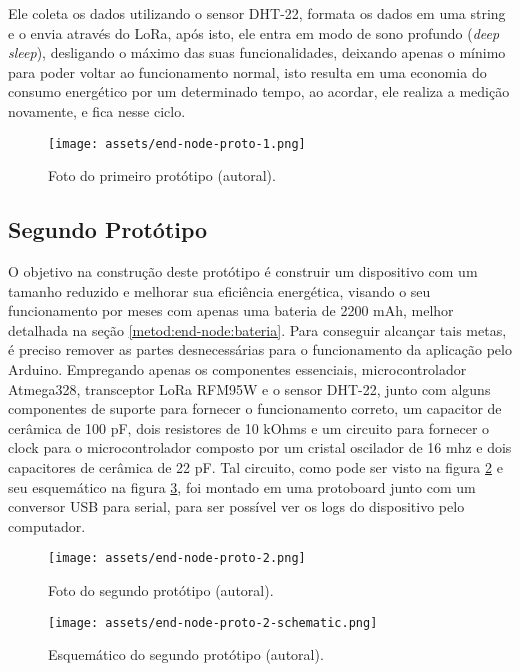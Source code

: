 Ele coleta os dados utilizando o sensor DHT-22, formata os dados em uma string e o envia através do LoRa, após isto, ele entra em modo de sono profundo (\textit{deep sleep}), desligando o máximo das suas funcionalidades, deixando apenas o mínimo para poder voltar ao funcionamento normal, isto resulta em uma economia do consumo energético por um determinado tempo, ao acordar, ele realiza a medição novamente, e fica nesse ciclo.

\begin{figure}[H]
  \centering
  \texttt{[image: assets/end-node-proto-1.png]} 
  \caption{Foto do primeiro protótipo (autoral).}
  \label{fig:end-node-proto-1} 
\end{figure}

\subsection{Segundo Protótipo}
\label{metod:end-node:2-proto}
O objetivo na construção deste protótipo é construir um dispositivo com um tamanho reduzido e melhorar sua eficiência energética, visando o seu funcionamento por meses com apenas uma bateria de 2200 mAh, melhor detalhada na seção \ref{metod:end-node:bateria}. Para conseguir alcançar tais metas, é preciso remover as partes desnecessárias para o funcionamento da aplicação pelo Arduino. Empregando apenas os componentes essenciais, microcontrolador Atmega328, transceptor LoRa RFM95W e o sensor DHT-22, junto com alguns componentes de suporte para fornecer o funcionamento correto, um capacitor de cerâmica de 100 pF, dois resistores de 10 kOhms  e um circuito para fornecer o clock para o microcontrolador composto por um cristal oscilador de 16 mhz e dois capacitores de cerâmica de 22 pF. Tal circuito, como pode ser visto na figura \ref{fig:end-node-proto-2} e seu esquemático na figura \ref{fig:end-node-proto-2-schematic}, foi montado em uma protoboard junto com um conversor USB para serial, para ser possível ver os logs do dispositivo pelo computador.

\begin{figure}[H]
  \centering
  \texttt{[image: assets/end-node-proto-2.png]} 
  \caption{Foto do segundo protótipo (autoral).}
  \label{fig:end-node-proto-2} 
\end{figure}

\begin{figure}[H]
  \centering
  \texttt{[image: assets/end-node-proto-2-schematic.png]} 
  \caption{Esquemático do segundo protótipo (autoral).}
  \label{fig:end-node-proto-2-schematic} 
\end{figure}

